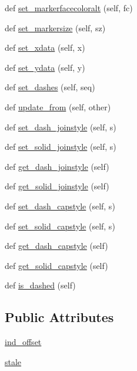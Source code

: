 \begin{DoxyCompactItemize}
def \hyperlink{classmatplotlib_1_1lines_1_1Line2D_a46df151e4fa4f29f2d7575ee2837b5bb}{set\+\_\+markerfacecoloralt} (self, fc)
\item 
def \hyperlink{classmatplotlib_1_1lines_1_1Line2D_a5d31136e08b5243bfb41aa4d727de8e5}{set\+\_\+markersize} (self, sz)
\item 
def \hyperlink{classmatplotlib_1_1lines_1_1Line2D_ab39bd70de2897d30064f1f05c2e90c6b}{set\+\_\+xdata} (self, x)
\item 
def \hyperlink{classmatplotlib_1_1lines_1_1Line2D_a0ad377f17534ab1eab0a79f812dc64b5}{set\+\_\+ydata} (self, y)
\item 
def \hyperlink{classmatplotlib_1_1lines_1_1Line2D_a7a35248e7061b61194409e50a381b7e1}{set\+\_\+dashes} (self, seq)
\item 
def \hyperlink{classmatplotlib_1_1lines_1_1Line2D_a9253b0e183b4436da362f20b1b2d54cd}{update\+\_\+from} (self, other)
\item 
def \hyperlink{classmatplotlib_1_1lines_1_1Line2D_a6c7a751ba4ec95aa454b5199adabcac3}{set\+\_\+dash\+\_\+joinstyle} (self, s)
\item 
def \hyperlink{classmatplotlib_1_1lines_1_1Line2D_acce6c98ed3119bafbf3feb3e27020f49}{set\+\_\+solid\+\_\+joinstyle} (self, s)
\item 
def \hyperlink{classmatplotlib_1_1lines_1_1Line2D_a475d151a158178a84dad23ebdd102208}{get\+\_\+dash\+\_\+joinstyle} (self)
\item 
def \hyperlink{classmatplotlib_1_1lines_1_1Line2D_a99a1c9e271c719f23ec9fad8956cb7c2}{get\+\_\+solid\+\_\+joinstyle} (self)
\item 
def \hyperlink{classmatplotlib_1_1lines_1_1Line2D_aa49caecc2a94b9dff54398773367aaca}{set\+\_\+dash\+\_\+capstyle} (self, s)
\item 
def \hyperlink{classmatplotlib_1_1lines_1_1Line2D_aa7d782e772dbdf4391e90449a15b4bf0}{set\+\_\+solid\+\_\+capstyle} (self, s)
\item 
def \hyperlink{classmatplotlib_1_1lines_1_1Line2D_aef7b2684a9d04c34cfad51ac8134382a}{get\+\_\+dash\+\_\+capstyle} (self)
\item 
def \hyperlink{classmatplotlib_1_1lines_1_1Line2D_a232ab7b1cb1044dce8abfc3e32120460}{get\+\_\+solid\+\_\+capstyle} (self)
\item 
def \hyperlink{classmatplotlib_1_1lines_1_1Line2D_a3b424d69cae73719e0b15e37af3a2bbd}{is\+\_\+dashed} (self)
\end{DoxyCompactItemize}
\subsection*{Public Attributes}
\begin{DoxyCompactItemize}
\item 
\hyperlink{classmatplotlib_1_1lines_1_1Line2D_ae10bc2c106bf6708c90b4fd27b7a413c}{ind\+\_\+offset}
\item 
\hyperlink{classmatplotlib_1_1lines_1_1Line2D_abdd56d425068c2d6d0cf3bec4121fa37}{stale}
\end{DoxyCompactItemize}
